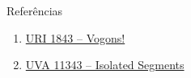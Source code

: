 \begin{frame}[fragile]{Referências}

    \begin{enumerate}
        \item \href{https://www.urionlinejudge.com.br/judge/pt/problems/view/1834}{URI 1843 -- Vogons!}

        \item \href{https://uva.onlinejudge.org/index.php?option=com_onlinejudge&Itemid=8&page=show_problem&category=24&problem=2318&mosmsg=Submission+received+with+ID+17919212}{UVA 11343 -- Isolated Segments}

    \end{enumerate}

\end{frame}
